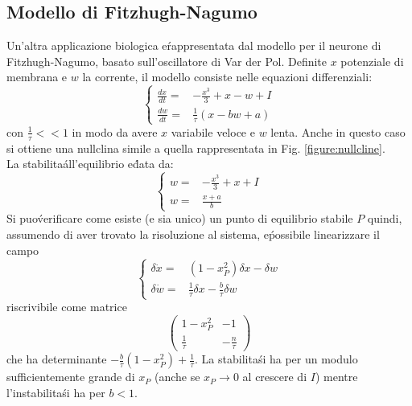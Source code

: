 \documentclass[12pt, a4paper]{book}
\theoremstyle{theorem}
\begin{document}
			\subsection{Modello di Fitzhugh-Nagumo}
				Un'altra applicazione biologica e\' rappresentata dal modello per il neurone di Fitzhugh-Nagumo, basato sull'oscillatore di Var der Pol.
				Definite $x$ potenziale di membrana e $w$ la corrente, il modello consiste nelle equazioni differenziali:
				\begin{equation}
					\begin{cases}
						\frac{dx}{dt}=&-\frac{x^3}{3}+x-w+I\\
						\frac{dw}{dt}=&\frac{1}{\tau}\left(x-bw+a\right)
					\end{cases}
					\label{equation:fitzhugh_nagumo}
				\end{equation}
				con $\frac{1}{\tau}<<1$ in modo da avere $x$ variabile veloce e $w$ lenta.
				Anche in questo caso si ottiene una nullclina simile a quella rappresentata in Fig. \ref{figure:nullcline}.\\
				La stabilita\' all'equilibrio e\' data da:
				\begin{equation*}
					\begin{cases}
						w=&-\frac{x^3}{3}+x+I\\
						w=&\frac{x+a}{b}
					\end{cases}
				\end{equation*}
				Si puo\' verificare come esiste (e sia unico) un punto di equilibrio stabile $P$ quindi, assumendo di aver trovato la risoluzione al sistema, e\' possibile linearizzare il campo
				\begin{equation*}
					\begin{cases}
						\delta\dot{x}=&\left(1-x_P^2\right)\delta x - \delta w\\
						\delta\dot{w}=&\frac{1}{\tau}\delta x -\frac{b}{\tau}\delta w
					\end{cases}
				\end{equation*}
				riscrivibile come matrice
				\begin{equation*}
					\left(
					\begin{matrix}
						1-x_P^2 & -1\\
						\frac{1}{\tau} & -\frac{n}{\tau}
					\end{matrix}
					\right)
				\end{equation*}
				che ha determinante $-\frac{b}{\tau}\left(1-x_P^2\right)+\frac{1}{\tau}$.
				La stabilita\' si ha per un modulo sufficientemente grande di $x_P$ (anche se $x_P\to 0$ al crescere di $I$) mentre l'instabilita\' si ha per $b<1$.
\end{document}
